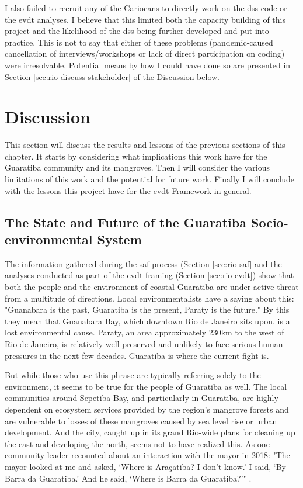 I also failed to recruit any of the Cariocans to directly work on the \ac{dss} code or the \ac{evdt} analyses. I believe that this limited both the capacity building of this project and the likelihood of the \ac{dss} being further developed and put into practice. This is not to say that either of these problems (pandemic-caused cancellation of interviews/workshops or lack of direct participation on coding) were irresolvable. Potential means by how I could have done so are presented in Section \ref{sec:rio-discuss-stakeholder} of the Discussion below.

\section{Discussion} \label{sec:rio-discussion}

This section will discuss the results and lessons of the previous sections of this chapter. It starts by considering what implications this work have for the Guaratiba community and its mangroves. Then I will consider the various limitations of this work and the potential for future work. Finally I will conclude with the lessons this project have for the \ac{evdt} Framework in general.

\subsection{The State and Future of the Guaratiba Socio- environmental System} 

The information gathered during the \ac{saf} process (Section \ref{sec:rio-saf} and the analyses conducted as part of the \ac{evdt} framing (Section \ref{sec:rio-evdt}) show that both the people and the environment of coastal Guaratiba are under active threat from a multitude of directions. Local environmentalists have a saying about this: "Guanabara is the past, Guaratiba is the present, Paraty is the future." By this they mean that Guanabara Bay, which downtown Rio de Janeiro sits upon, is a lost environmental cause. Paraty, an area approximately 230km to the west of Rio de Janeiro, is relatively well preserved and unlikely to face serious human pressures in the next few decades. Guaratiba is where the current fight is. 

But while those who use this phrase are typically referring solely to the environment, it seems to be true for the people of Guaratiba as well. The local communities around Sepetiba Bay, and particularly in Guaratiba, are highly dependent on ecosystem services provided by the region's mangrove forests and are vulnerable to losses of these mangroves caused by sea level rise or urban development.  And the city, caught up in its grand Rio-wide plans for cleaning up the east and developing the north, seems not to have realized this. As one community leader recounted about an interaction with the mayor in 2018: "The mayor looked at me and asked, `Where is Araçatiba? I don’t know.’ I said, `By Barra da Guaratiba.’ And he said, `Where is Barra da Guaratiba?'" \cite{stroblFollowingRecentEviction2018}. 


